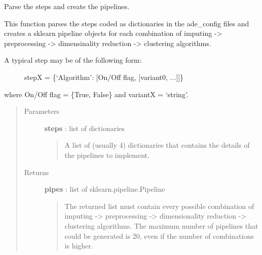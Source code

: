 \documentclass[letterpaper,10pt,english]{sphinxmanual}
\begin{document}
\begin{fulllineitems}
\label{index:adenine.core.define_pipeline.parse_steps}
Parse the steps and create the pipelines.

This function parses the steps coded as dictionaries in the ade\_config files and creates a sklearn pipeline objects for each combination of imputing -\textgreater{} preprocessing -\textgreater{} dimensinality reduction -\textgreater{} clustering algorithms.
\begin{description}
\item[{A typical step may be of the following form:}] \leavevmode
stepX = \{`Algorithm': {[}On/Off flag, {[}variant0, ...{]}{]}\}

\end{description}

where On/Off flag = \{True, False\} and variantX = `string'.
\begin{quote}\begin{description}
\item[{Parameters}] \leavevmode
\textbf{steps} : list of dictionaries
\begin{quote}

A list of (usually 4) dictionaries that contains the details of the pipelines to implement.
\end{quote}

\item[{Returns}] \leavevmode
\textbf{pipes} : list of sklearn.pipeline.Pipeline
\begin{quote}

The returned list must contain every possible combination of imputing -\textgreater{} preprocessing -\textgreater{} dimensionality reduction -\textgreater{} clustering algorithms. The maximum number of pipelines that could be generated is 20, even if the number of combinations is higher.
\end{quote}

\end{description}\end{quote}

\end{fulllineitems}

\label{index:module-adenine.core.pipelines}
\end{document}

